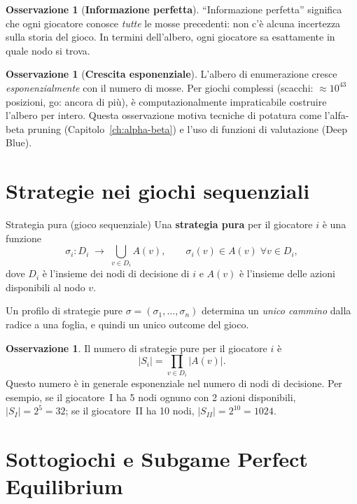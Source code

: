 \documentclass[12pt,a4paper,twoside]{book}
\theoremstyle{plain}
\theoremstyle{definition}
\newtheorem{remark}[theorem]{Osservazione}
\begin{document}
\begin{remark}[\textbf{Informazione perfetta}]
``Informazione perfetta'' significa che ogni giocatore conosce \emph{tutte} le mosse precedenti: non c'è alcuna incertezza sulla storia del gioco. In termini dell'albero, ogni giocatore sa esattamente in quale nodo si trova.
\end{remark}

\begin{remark}[\textbf{Crescita esponenziale}]
L'albero di enumerazione cresce \emph{esponenzialmente} con il numero di mosse. Per giochi complessi (scacchi: $\approx 10^{43}$ posizioni, go: ancora di più), è computazionalmente impraticabile costruire l'albero per intero. Questa osservazione motiva tecniche di potatura come l'alfa-beta pruning (Capitolo~\ref{ch:alpha-beta}) e l'uso di funzioni di valutazione (Deep Blue).
\end{remark}

\section{Strategie nei giochi sequenziali}

\begin{defbox}{Strategia pura (gioco sequenziale)}
Una \textbf{strategia pura} per il giocatore $i$ è una funzione
\[
  \sigma_i : D_i \;\longrightarrow\; \bigcup_{v \in D_i} A(v),
  \qquad \sigma_i(v)\in A(v)\;\forall v\in D_i,
\]
dove $D_i$ è l'insieme dei nodi di decisione di $i$ e $A(v)$ è l'insieme delle azioni disponibili al nodo $v$.

Un profilo di strategie pure $\sigma = (\sigma_1,\dots,\sigma_n)$ determina un \emph{unico cammino} dalla radice a una foglia, e quindi un unico outcome del gioco.
\end{defbox}

\begin{remark}
Il numero di strategie pure per il giocatore $i$ è
\[
  |S_i| = \prod_{v \in D_i} |A(v)|.
\]
Questo numero è in generale esponenziale nel numero di nodi di decisione. Per esempio, se il giocatore~I ha 5 nodi ognuno con 2 azioni disponibili, $|S_I| = 2^5 = 32$; se il giocatore~II ha 10 nodi, $|S_{II}| = 2^{10} = 1024$.
\end{remark}

\section{Sottogiochi e Subgame Perfect Equilibrium}
\end{document}
